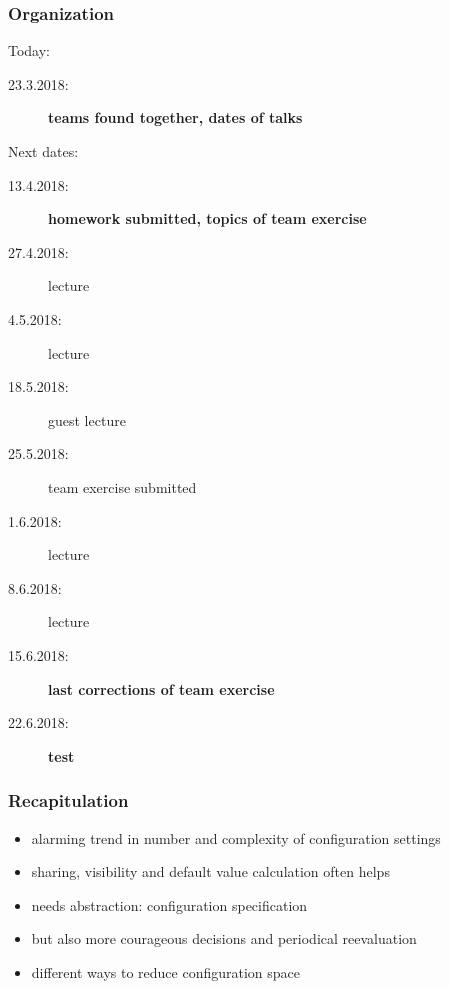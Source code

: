 




\date{23.3.2018}



\renewcommand{\enquote}[1]{\emph{``#1''}} %

\begin{frame}
	\titlepage
	\doclicenseThis
\end{frame}

\begin{frame}
	\frametitle{Organization}
	Today:
	\begin{description}
		\item[23.3.2018:] \textbf{teams found together, dates of talks}
	\end{description}
	Next dates:
	\begin{description}
		\item[13.4.2018:] \textbf{homework submitted, topics of team exercise}
		\item[27.4.2018:] lecture
		\item[4.5.2018:] lecture
		\item[18.5.2018:] guest lecture
		\item[25.5.2018:] team exercise submitted
		\item[1.6.2018:] lecture
		\item[8.6.2018:] lecture
		\item[15.6.2018:] \textbf{last corrections of team exercise}
		\item[22.6.2018:] \textbf{test}
	\end{description}
\end{frame}

\begin{frame}[fragile]
	\frametitle{Recapitulation}

	\begin{itemize}[<+-| alert@+>]
	\item alarming trend in number and complexity of configuration settings
	\item sharing, visibility and default value calculation often helps
	\item needs abstraction: configuration specification
	\item but also more courageous decisions and periodical reevaluation
	\item different ways to reduce configuration space
	\end{itemize}
\end{frame}

